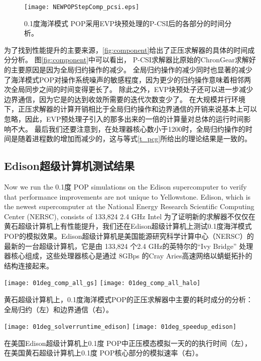 \begin {figure}[t!]
\centering

\texttt{[image: NEWPOPStepComp\_pcsi.eps]}
\caption[] { 0.1度海洋模式 POP采用EVP块预处理的P-CSI后的各部分的时间分析。 \label{fig:StepComp_pcsi}}
\end{figure}



为了找到性能提升的主要来源，\ref{fig:component}给出了正压求解器的具体的时间成分分析。 
图\ref{fig:component}中可以看出， P-CSI求解器比原始的ChronGear求解好的主要原因是因为全局归约操作的减少。 
全局归约操作的减少同时也显著的减少了海洋模式POP对操作系统噪声的敏感程度\cite{ferreira}，因为更少的归约操作意味着相邻两次全局同步之间的时间变得更长了。 
除此之外，EVP块预处子还可以进一步减少边界通信，因为它是的达到收敛所需要的迭代次数变少了。 
在大规模并行环境下，正压求解器的计算开销相比于全局归约操作和边界通信的开销来说基本上可以忽略，因此，EVP预处理子引入的那多出来的一倍的计算量对总体的运行时间影响不大。
最后我们还要注意到，在处理器核心数小于1200时，全局归约操作的时间是随着进程数的增加而减少的，这与等式\ref{t_pcg}所给出的理论结果是一致的。

 

\subsection{Edison超级计算机测试结果}
Now we run the 0.1度 POP simulations on the Edison supercomputer
to verify that performance improvements are not unique to Yellowstone.
Edison, which is the newest supercomputer at the National Energy
Research Scientific Computing Center (NERSC), consists of 133,824 2.4
GHz Intel
为了证明新的求解器不仅仅在黄石超级计算机上有性能提升，我们还在Edison超级计算机上测试0.1度海洋模式POP的模拟效果。Edison超级计算机是美国能源研究科学计算中心（NERSC）的最新的一台超级计算机，它是由 133,824 个2.4 GHz的英特尔的``Ivy Bridge'' 处理器核心组成，这些处理器核心是通过 8GBps 的Cray
Aries高速网络以蜻蜓拓扑的结构连接起来。  
\begin {figure*}[t!]
\begin{center}
\texttt{[image: 01deg\_comp\_all\_gs]}
\hspace{10pt}
\texttt{[image: 01deg\_comp\_all\_halo]}
\end{center}
\caption[] {黄石超级计算机上，0.1度海洋模式POP的正压求解器中主要的耗时成分的分析：全局归约（左）和边界通信（右）。  }
\label{fig:component}
\end {figure*}
\begin {figure*}[t!]
\begin{center}
\texttt{[image: 01deg\_solverruntime\_edison]}
\hspace{10pt}
\texttt{[image: 01deg\_speedup\_edison]}
\end{center}
 
\caption []{在美国Edison超级计算机上0.1度 POP中正压模态模拟一天的的执行时间（左）， 
在美国黄石超级计算机上0.1度 POP核心部分的模拟速率（右）。\label {fig:runtime01_edison}}
 
\end {figure*}

